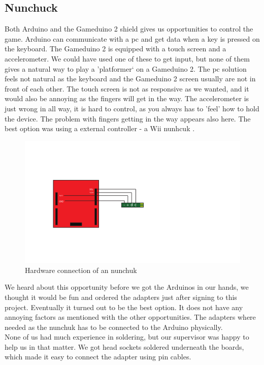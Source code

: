 \subsection{Nunchuck}%
        Both Arduino and the Gameduino 2 shield gives us opportunities to control the game.
Arduino can communicate with a pc and get data when a key is pressed on the keyboard.
The Gameduino 2 is equipped with a touch screen and a accelerometer. We could have used
one of these to get input, but none of them
gives a natural way to play a 'platformer` on a Gameduino 2. The pc solution
feels not natural as the keyboard and the Gameduino 2 screen usually are not in front of each other. The touch screen is not as responsive as we wanted, and it would also be annoying
as the fingers will get in the way. The accelerometer is just wrong in all way, it is hard
to control, as you always has to 'feel' how to hold the device. The problem with fingers
getting in the way appears also here. The best option was using a external controller - a Wii nunhcuk
.
\begin{figure}[b]
  \centering
  \includegraphics{Figures/NunchuckConnection}
  \caption{Hardware connection of an nunchuk}
  \label{fig:nunchuk_connect}
\end{figure}


We heard about this opportunity before we got the Arduinos in our
hands, we thought it would be fun and ordered the adapters just after signing
to this project. Eventually it turned out to be the best option. It does
not have any annoying factors as mentioned with the other opportunities.
The adapters where needed as the nunchuk has to be connected to the Arduino physically.
\\
None of us had much experience in soldering, but our supervisor was happy to help
us in that matter. We got head sockets soldered underneath the boards, which made it
easy to connect the adapter using pin cables.

